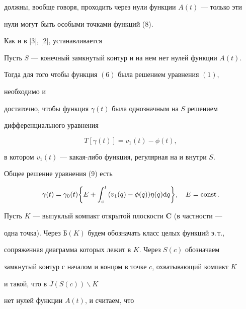 должны, вообще говоря, проходить через нули функции $A(t)$ --- только эти


нули могут быть особыми точками функций (8).





Как и в [3], [2], устанавливается





\begin{thm}


Пусть $S$ --- конечный замкнутый контур и на нем нет нулей функции $A(t)$.


Тогда для того чтобы функция $(6)$ была решением уравнения $(1)$,


необходимо и


достаточно, чтобы функция $\gamma(t)$ была однозначным на $S$ решением


дифференциального уравнения


\begin{equation}


T[\gamma(t)]=v_1(t)-\phi(t),


\end{equation}


в котором $v_1(t)$ --- какая-либо функция, регулярная на и внутри $S$.


\end{thm}





Общее решение уравнения (9) есть


$$


\gamma(t)=\gamma_0(t) \bigg\{ E+\int_c^t{(v_1(q)-\phi(q))\eta(q)\dd q}


\bigg\},


\quad E=\const.


$$





Пусть $K$ --- выпуклый компакт открытой плоскости {\bf C} (в частности ---


одна точка). Через $Б(K)$ будем обозначать класс целых функций э.\,т.,


сопряженная диаграмма которых лежит в $K$. Через $S(c)$ обозначаем


замкнутый контур с началом и концом в точке $c$, охватывающий компакт $K$


и такой, что в $\overline J(S(c))\backslash K$


нет нулей функции $A(t)$, и считаем, что


